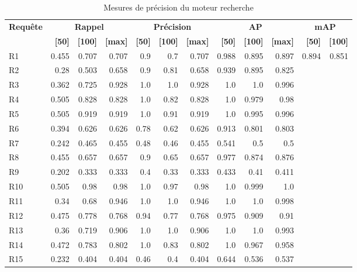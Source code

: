 \begin{table}[H]
\centering
\begin{tabular}{l|rrr|rrr|rrr|rr}
\toprule
\textbf{Requête} & \multicolumn{3}{c}{\textbf{Rappel}} & \multicolumn{3}{c}{\textbf{Précision}} & \multicolumn{3}{c}{\textbf{AP}} & \multicolumn{2}{c}{\textbf{mAP}} \\
 & \textbf{[50]} & \textbf{[100]} & \textbf{[max]} & \textbf{[50]} & \textbf{[100]} & \textbf{[max]} & \textbf{[50]} & \textbf{[100]} & \textbf{[max]} & \textbf{[50]} & \textbf{[100]} \\
\midrule
R1 & 0.455 & 0.707 & 0.707 & 0.9 & 0.7 & 0.707 & 0.988 & 0.895 & 0.897 & \multirow{15}{*}{0.894} & \multirow{15}{*}{0.851} \\
R2 & 0.28 & 0.503 & 0.658 & 0.9 & 0.81 & 0.658 & 0.939 & 0.895 & 0.825 \\
R3 & 0.362 & 0.725 & 0.928 & 1.0 & 1.0 & 0.928 & 1.0 & 1.0 & 0.996 \\
R4 & 0.505 & 0.828 & 0.828 & 1.0 & 0.82 & 0.828 & 1.0 & 0.979 & 0.98 \\
R5 & 0.505 & 0.919 & 0.919 & 1.0 & 0.91 & 0.919 & 1.0 & 0.995 & 0.996 \\
R6 & 0.394 & 0.626 & 0.626 & 0.78 & 0.62 & 0.626 & 0.913 & 0.801 & 0.803 \\
R7 & 0.242 & 0.465 & 0.455 & 0.48 & 0.46 & 0.455 & 0.541 & 0.5 & 0.5 \\
R8 & 0.455 & 0.657 & 0.657 & 0.9 & 0.65 & 0.657 & 0.977 & 0.874 & 0.876 \\
R9 & 0.202 & 0.333 & 0.333 & 0.4 & 0.33 & 0.333 & 0.433 & 0.41 & 0.411 \\
R10 & 0.505 & 0.98 & 0.98 & 1.0 & 0.97 & 0.98 & 1.0 & 0.999 & 1.0 \\
R11 & 0.34 & 0.68 & 0.946 & 1.0 & 1.0 & 0.946 & 1.0 & 1.0 & 0.998 \\
R12 & 0.475 & 0.778 & 0.768 & 0.94 & 0.77 & 0.768 & 0.975 & 0.909 & 0.91 \\
R13 & 0.36 & 0.719 & 0.906 & 1.0 & 1.0 & 0.906 & 1.0 & 1.0 & 0.993 \\
R14 & 0.472 & 0.783 & 0.802 & 1.0 & 0.83 & 0.802 & 1.0 & 0.967 & 0.958 \\
R15 & 0.232 & 0.404 & 0.404 & 0.46 & 0.4 & 0.404 & 0.644 & 0.536 & 0.537 \\
\bottomrule
\end{tabular}
\caption{Mesures de précision du moteur recherche}
\label{tab:results}
\end{table}
